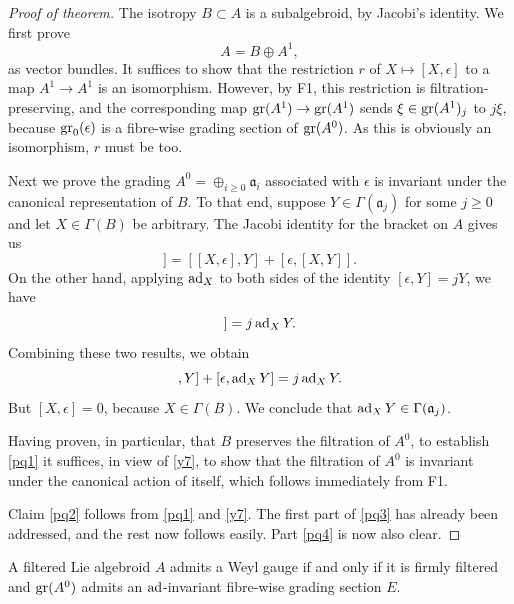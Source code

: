 \documentclass[leqno,12pt]{amsart} %
\begin{document}
\begin{proof}[Proof of theorem]
  The isotropy $B \subset A$ is a subalgebroid, by Jacobi's identity. We first prove
  \begin{equation}
     A = B \oplus A^1, \label{y7}
  \end{equation}
  as vector bundles. It suffices to show that the restriction $r$ of
  $X \mapsto [X, \epsilon]$ to a map $A^1 \rightarrow A^1$ is an isomorphism. However, by
  F1, this restriction is filtration-preserving, and the corresponding map
  $\operatorname{\operatorname{gr}}(A^1) \rightarrow \operatorname{\operatorname{gr}}(A^1)$ sends $\xi \in \operatorname{\operatorname{gr}}(A^1)_j$ to $j \xi$,
  because $\operatorname{\operatorname{gr}}_0(\epsilon)$ is a fibre-wise grading section of $\operatorname{\operatorname{gr}}(A^0)$. As this
  is obviously an isomorphism, $r$ must be too.

  Next we prove the grading $A^0=\oplus_{i\ge0}{\mathfrak a}_i$ associated with $\epsilon$ is
  invariant under the canonical representation of $B$. To that end, suppose
  $Y \in \Gamma({\mathfrak a}_j)$ for some $j\ge 0$ and let $X \in \Gamma(B)$ be
  arbitrary. The Jacobi identity for the bracket on $A$ gives us
  \begin{equation*}
    [X, [\epsilon, Y]] = [[X, \epsilon], Y] + [\epsilon, [X, Y]].
  \end{equation*}
  On the other hand, applying $\operatorname{ad}_X$ to both sides of the
  identity $[\epsilon, Y] = jY$, we have
  \begin{equation*}
     [X, [\epsilon, Y]] = j\adjoint_XY.
  \end{equation*}
  Combining these two results, we obtain
  \begin{equation*}
    [[X, \epsilon], Y] + [\epsilon, \adjoint_XY] = j \adjoint_XY.
  \end{equation*}
  But $[X, \epsilon] = 0 $, because $X \in \Gamma(B)$. We conclude that
  $\operatorname{ad}_XY \in \Gamma({\mathfrak a}_j)$.

  Having proven, in particular, that $B$ preserves the filtration of $A^0$, to establish
  \eqref{pq1} it suffices, in view of \eqref{y7}, to show that the filtration of $A^0$ is
  invariant under the canonical action of itself, which follows immediately from F1.

  Claim \eqref{pq2} follows from \eqref{pq1} and \eqref{y7}. The first part of \eqref{pq3}
  has already been addressed, and the rest now follows easily. Part \eqref{pq4} is now also
  clear.
\end{proof}

\begin{corollary}\label{ew1}
  A filtered Lie algebroid $A$ admits a Weyl gauge if and only if it is firmly
  filtered and $\operatorname{\operatorname{gr}}(A^0)$ admits an $\operatorname{ad}$-invariant fibre-wise grading section $E$.
\end{corollary}
\end{document}
